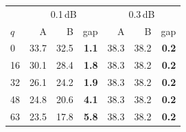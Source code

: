 \begin{tabular}{lrrrrrr}
\toprule
& \multicolumn{3}{c}{0.1\,dB} & \multicolumn{3}{c}{0.3\,dB} \\
$q$ & A & B & gap & A & B & gap \\
\midrule
0 & 33.7 & 32.5 & \textbf{1.1} & 38.3 & 38.2 & \textbf{0.2} \\
16 & 30.1 & 28.4 & \textbf{1.8} & 38.3 & 38.2 & \textbf{0.2} \\
32 & 26.1 & 24.2 & \textbf{1.9} & 38.3 & 38.2 & \textbf{0.2} \\
48 & 24.8 & 20.6 & \textbf{4.1} & 38.3 & 38.2 & \textbf{0.2} \\
63 & 23.5 & 17.8 & \textbf{5.8} & 38.3 & 38.2 & \textbf{0.2} \\
\bottomrule
\end{tabular}
